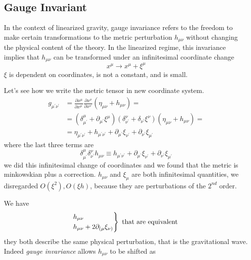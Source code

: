 \subsection{Gauge Invariant}
In the context of linearized gravity, gauge invariance refers to the freedom to make certain transformations to the metric perturbation $h_{\mu \nu }$ without changing the physical content of the theory. In the linearized regime, this invariance implies that $h_{\mu \nu }$ can be transformed under an infinitesimal coordinate change
\[
x^{\mu } \to x^{\mu }+ \xi^{\mu }  
\]
$\xi $ is dependent on coordinates, is not a constant, and is small.\par
Let's see how we write the metric tensor in new coordinate system.
\begin{align}
	g_{\mu ^{\prime }\nu ^{\prime }} &= \frac{\partial x^{\mu }}{\partial x^{\mu ^{\prime }}} \frac{\partial x^{\nu }}{\partial x^{\nu ^{\prime }}} \left( \eta _{\mu \nu } +h_{\mu \nu } \right) = \nonumber\\
	 &= \left( \delta ^{\mu }_{\mu ^{\prime }} + \partial_{\mu ^{\prime }}\xi ^{\mu } \right) \left( \delta^{\nu }_{\nu ^{\prime }} + \delta_{\nu ^{\prime }} \xi ^{\nu } \right) \left( \eta _{\mu \nu }+h_{\mu \nu } \right) = \nonumber\\
	&= \eta _{\mu ^{\prime }\nu ^{\prime }} + h_{\mu ^{\prime }\nu ^{\prime }} +\partial_{\mu ^{\prime }}\xi _{\nu ^{\prime }}+\partial_{\nu ^{\prime }}\xi _{\mu ^{\prime }}
\end{align}
where the last three terms are
\begin{equation}
\delta ^{\mu }_{\mu ^{\prime }}\delta ^{\nu }_{\nu ^{\prime }}h_{\mu \nu } \equiv   h_{\mu ^{\prime }\nu ^{\prime }} +\partial_{\mu ^{\prime }}\xi _{\nu ^{\prime }}+\partial_{\nu ^{\prime }}\xi _{\mu ^{\prime }}
\end{equation}
we did this infinitesimal change of coordinates and we found that the metric is minkowskian plus a correction. $h_{\mu \nu }$ and $\xi _{\mu }$	are both infinitesimal quantities, we disregarded $O\left( \xi ^{2} \right), O\left( \xi h \right)$, because they are perturbations of the $2^{nd}$ order. \par
We have
\[
\begin{rcases*}
h_{\mu \nu }\\
h_{\mu \nu }+ 2\partial_{(\mu  }\xi _{\nu )}
\end{rcases*}
\text{ that are equivalent }
\]
they both describe the same physical perturbation, that is the gravitational wave. Indeed \emph{gauge invariance} allows $h_{\mu \nu } $ to be shifted as
